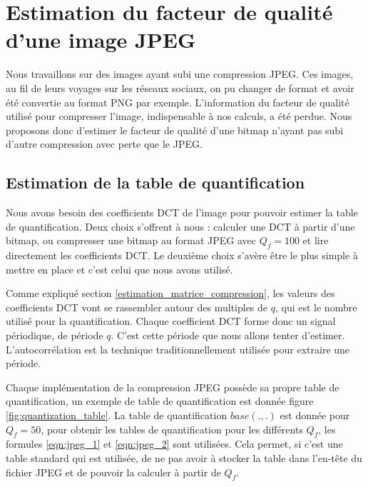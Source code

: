 \documentclass[utf8,final]{stageM2R} %
\begin{document}
\section{Estimation du facteur de qualité d'une image JPEG}
Nous travaillons sur des images ayant subi une compression JPEG. Ces images, au fil de leurs voyages sur les réseaux sociaux, on pu changer de format et avoir été convertie au format PNG par exemple. L'information du facteur de qualité utilisé pour compresser l'image, indispensable à nos calculs, a été perdue. Nous proposons donc d'estimer le facteur de qualité d'une bitmap n'ayant pas subi d'autre compression avec perte que le JPEG.

\subsection{Estimation de la table de quantification}
Nous avons besoin des coefficients DCT de l'image pour pouvoir estimer la table de quantification. Deux choix s'offrent à nous : calculer une DCT à partir d'une bitmap, ou compresser une bitmap au format JPEG avec $Q_f = 100$ et lire directement les coefficients DCT. Le deuxième choix s'avère être le plus simple à mettre en place et c'est celui que nous avons utilisé.

Comme expliqué section \ref{estimation_matrice_compression}, les valeurs des coefficients DCT vont se rassembler autour des multiples de $q$, qui est le nombre utilisé pour la quantification. Chaque coefficient DCT forme donc un signal périodique, de période $q$. C'est cette période que nous allons tenter d'estimer. L'autocorrélation est la technique traditionnellement utilisée pour extraire une période.

Chaque implémentation de la compression JPEG possède sa propre table de quantification, un exemple de table de quantification est donnée figure \ref{fig:quantization_table}. La table de quantification $base(.,.)$ est donnée pour $Q_f = 50$, pour obtenir les tables de quantification pour les différents $Q_f$, les formules \ref{eqn:jpeg_1} et \ref{eqn:jpeg_2} sont utilisées. Cela permet, si c'est une table standard qui est utilisée, de ne pas avoir à stocker la table dans l'en-tête du fichier JPEG et de pouvoir la calculer à partir de $Q_f$.
\end{document}
